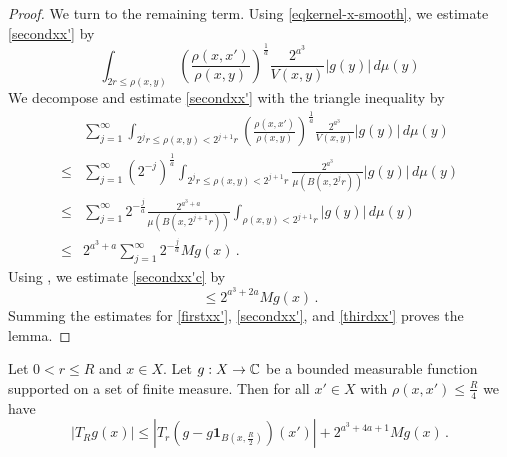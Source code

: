 \begin{proof}
We turn to the remaining term. Using \eqref{eqkernel-x-smooth}, we estimate \eqref{secondxx'} by
\begin{equation}\label{secondxx'b}
 \int_{2r\le\rho(x,y)} \left(\frac{\rho(x,x')}{\rho(x,y)}\right)^{\frac{1}{a}}\frac{2^{a^3}}{V(x,y)} |g(y)| \,d\mu(y)
\end{equation}
We decompose and estimate
\eqref{secondxx'}
with the triangle inequality by
\begin{align}
 &\sum_{j=1}^\infty  \int_{2^jr\le\rho(x,y)< 2^{j+1}r}
 \left(\frac{\rho(x,x')}{\rho(x,y)}\right)^{\frac{1}{a}}\frac{2^{a^3}}{V(x,y)} |g(y)| \,d\mu(y)\, \\
 \le&
 \sum_{j=1}^\infty \left( 2^{-j} \right)^{\frac{1}{a}} \int_{2^jr\le\rho(x,y)< 2^{j+1}r} \frac{2^{a^3}}{\mu(B(x,2^j r))} |g(y)| \,d\mu(y) \\
 \le&
\sum_{j=1}^\infty 2^{-\frac{j}{a}} \frac{2^{a^3 + a}}{\mu(B(x,2^{j+1} r))} \int_{\rho(x,y)<2^{j+1}r}
|g(y)| \, d\mu(y) \\
\label{secondxx'c}
\le& 2^{a^3 + a} \sum_{j=1}^\infty 2^{-\frac{j}{a}} Mg(x)\,.
\end{align}
Using , we estimate
\eqref{secondxx'c} by
\begin{equation}\label{secondxx'd}
\le 2^{a^3 + 2a} Mg(x) \,.
\end{equation}
Summing the estimates
for \eqref{firstxx'},
\eqref{secondxx'}, and
\eqref{thirdxx'}
proves the lemma.
\end{proof}

\begin{lemma}
\label{Cotlar-control}
\leanok
{}
Let $0<r\le R$ and  $x\in X$. Let $g:X\to\mathbb{C}$ be a bounded measurable function supported on a set of finite measure.
Then for all $x'\in X$ with $\rho(x,x')\le\frac {R}{4}$ we have
\begin{equation}\label{eq-cotlar-control}
\left|T_R g(x)
\right|\le
|T_r(g-g\mathbf{1}_{B(x,\frac {R} 2)})(x')| +
2^{a^3 + 4a + 1} Mg(x)\, .
\end{equation}
\end{lemma}

